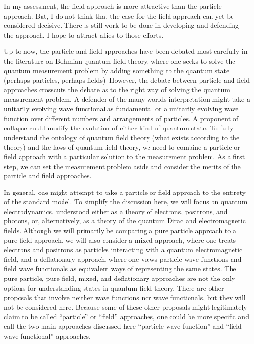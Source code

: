 \documentclass[onecolumn,secnumarabic,amsmath,amssymb,balancelastpage,nofootinbib,12pt]{article}
\begin{document}
In my assessment, the field approach is more attractive than the particle approach.  But, I do not think that the case for the field approach can yet be considered decisive.  There is still work to be done in developing and defending the approach.  I hope to attract allies to those efforts.

Up to now, the particle and field approaches have been debated most carefully in the literature on Bohmian quantum field theory, where one seeks to solve the quantum measurement problem by adding something to the quantum state (perhaps particles, perhaps fields).  However, the debate between particle and field approaches crosscuts the debate as to the right way of solving the quantum measurement problem.  A defender of the many-worlds interpretation might take a unitarily evolving wave functional as fundamental or a unitarily evolving wave function over different numbers and arrangements of particles.  A proponent of collapse could modify the evolution of either kind of quantum state.  To fully understand the ontology of quantum field theory (what exists according to the theory) and the laws of quantum field theory, we need to combine a particle or field approach with a particular solution to the measurement problem.  As a first step, we can set the measurement problem aside and consider the merits of the particle and field approaches.

In general, one might attempt to take a particle or field approach to the entirety of the standard model.  To simplify the discussion here, we will focus on quantum electrodynamics, understood either as a theory of electrons, positrons, and photons, or, alternatively, as a theory of the quantum Dirac and electromagnetic fields.  Although we will primarily be comparing a pure particle approach to a pure field approach, we will also consider a mixed approach, where one treats electrons and positrons as particles interacting with a quantum electromagnetic field, and a deflationary approach, where one views particle wave functions and field wave functionals as equivalent ways of representing the same states.  The pure particle, pure field, mixed, and deflationary approaches are not the only options for understanding states in quantum field theory.  There are other proposals that involve neither wave functions nor wave functionals, but they will not be considered here.  Because some of these other proposals might legitimately claim to be called ``particle'' or ``field'' approaches, one could be more specific and call the two main approaches discussed here ``particle wave function'' and ``field wave functional'' approaches.
\end{document}
